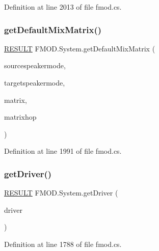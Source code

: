 Definition at line 2013 of file fmod.\+cs.

\mbox{\label{class_f_m_o_d_1_1_system_a7743f89e5cfb3d695bba2f280e8a3de9}} 
\subsubsection{\texorpdfstring{get\+Default\+Mix\+Matrix()}{getDefaultMixMatrix()}}
{\footnotesize\ttfamily \hyperlink{namespace_f_m_o_d_a305d1176ef3f8c8815861a60407ac33d}{R\+E\+S\+U\+LT} F\+M\+O\+D.\+System.\+get\+Default\+Mix\+Matrix (\begin{DoxyParamCaption}\item[{\hyperlink{namespace_f_m_o_d_aa0732e7e8efd3b96b526a7f2f8479634}{S\+P\+E\+A\+K\+E\+R\+M\+O\+DE}}]{sourcespeakermode,  }\item[{\hyperlink{namespace_f_m_o_d_aa0732e7e8efd3b96b526a7f2f8479634}{S\+P\+E\+A\+K\+E\+R\+M\+O\+DE}}]{targetspeakermode,  }\item[{float \mbox{[}$\,$\mbox{]}}]{matrix,  }\item[{int}]{matrixhop }\end{DoxyParamCaption})}



Definition at line 1991 of file fmod.\+cs.

\mbox{\label{class_f_m_o_d_1_1_system_a3df9be7f70a7f711c7ac0d463ebdfe93}} 
\subsubsection{\texorpdfstring{get\+Driver()}{getDriver()}}
{\footnotesize\ttfamily \hyperlink{namespace_f_m_o_d_a305d1176ef3f8c8815861a60407ac33d}{R\+E\+S\+U\+LT} F\+M\+O\+D.\+System.\+get\+Driver (\begin{DoxyParamCaption}\item[{out int}]{driver }\end{DoxyParamCaption})}



Definition at line 1788 of file fmod.\+cs.


